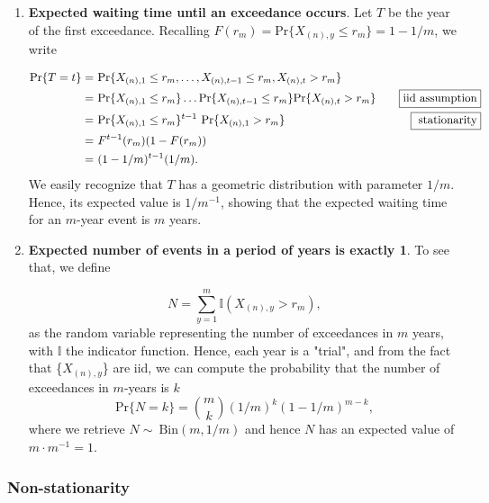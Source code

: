 \begin{enumerate}
	\item \textbf{Expected waiting time until an exceedance occurs}. Let $T$ be the year of the first exceedance. Recalling $F(r_m) = \text{Pr} \big\{X_{(n),y}\leq r_m\big\}=1-1/m$, we write
	
	\begin{equation*}
	\begin{aligned}
	\text{Pr}\{T=t\}=\  & \text{Pr}\{X_{(n),1}\leq r_m,\dots,X_{(n),t-1}\leq r_m,X_{(n),t}>r_m\} \\
	=\ & \text{Pr}\{X_{(n),1}\leq r_m\}\dots\text{Pr}\{X_{(n),t-1}\leq r_m\}\text{Pr}\{X_{(n),t}>r_m\}&  \quad  \boxed{\textnormal{iid assumption}}\\
	= \ & \text{Pr}\{X_{(n),1}\leq r_m\}^{t-1}\ \text{Pr}\{X_{(n),1}>r_m\} &  \quad \boxed{\text{ stationarity}}\\
	=\ & F^{t-1}(r_m)(1-F(r_m))\\
	=\ & (1-1/m)^{t-1}(1/m).
	\end{aligned}
	\end{equation*}
	We easily recognize that $T$ has a geometric distribution with parameter $1/m$. Hence, its expected value is $1/m^{-1}$, showing that the expected waiting time for an $m$-year event is $m$ years.
	
	\item \textbf{Expected number of events in a period of  years is exactly 1}. To see that, we define  
	
	\begin{equation*}N=\sum_{y=1}^m \mathbb{I}(X_{(n),y}>r_m),
	\end{equation*}
	as the random variable representing the number of exceedances in $m$ years, with $\mathbb{I}$ the indicator function. Hence, each year is a "trial", and from the fact that \big\{$X_{(n),y}$\big\} are iid, we can compute the probability that the number of exceedances in $m$-years is $k$
	\begin{equation*}
	\text{Pr}\{N=k\}=\binom{m}{k}(1/m)^k(1-1/m)^{m-k},
	\end{equation*}
	where we retrieve $N\sim \ \text{Bin}(m,1/m)$ and hence $N$ has an expected value of $m\cdot m^{-1}=1$.
	
\end{enumerate}


\subsubsection*{Non-stationarity}

